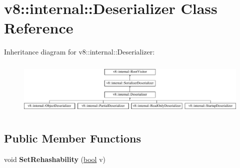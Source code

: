 \hypertarget{classv8_1_1internal_1_1Deserializer}{}\section{v8\+:\+:internal\+:\+:Deserializer Class Reference}
\label{classv8_1_1internal_1_1Deserializer}
Inheritance diagram for v8\+:\+:internal\+:\+:Deserializer\+:\begin{figure}[H]
\begin{center}
\leavevmode
\includegraphics[height=2.641509cm]{classv8_1_1internal_1_1Deserializer}
\end{center}
\end{figure}
\subsection*{Public Member Functions}
\begin{DoxyCompactItemize}
\item 
\mbox{\label{classv8_1_1internal_1_1Deserializer_a7ddc0f395c112a6d124311cd7567ce83}} 
void {\bfseries Set\+Rehashability} (\mbox{\hyperlink{classbool}{bool}} v)
\end{DoxyCompactItemize}
